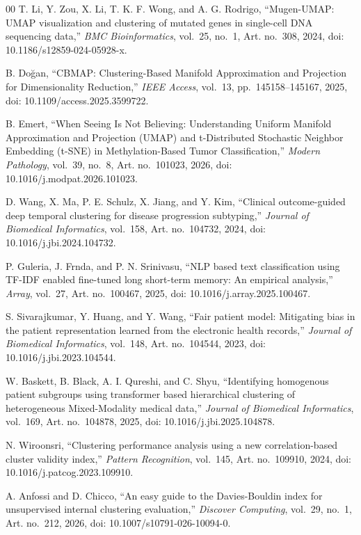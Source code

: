 \documentclass[a4paper,10pt,conference]{IEEEtran}
\begin{document}
\begin{thebibliography}{00}
 T. Li, Y. Zou, X. Li, T. K. F. Wong, and A. G. Rodrigo, ``Mugen-UMAP: UMAP visualization and clustering of mutated genes in single-cell DNA sequencing data,'' \textit{BMC Bioinformatics}, vol.~25, no.~1, Art. no.~308, 2024, doi: 10.1186/s12859-024-05928-x.

 B. Doğan, ``CBMAP: Clustering-Based Manifold Approximation and Projection for Dimensionality Reduction,'' \textit{IEEE Access}, vol.~13, pp.~145158--145167, 2025, doi: 10.1109/access.2025.3599722.

 B. Emert, ``When Seeing Is Not Believing: Understanding Uniform Manifold Approximation and Projection (UMAP) and t-Distributed Stochastic Neighbor Embedding (t-SNE) in Methylation-Based Tumor Classification,'' \textit{Modern Pathology}, vol.~39, no.~8, Art. no.~101023, 2026, doi: 10.1016/j.modpat.2026.101023.

 D. Wang, X. Ma, P. E. Schulz, X. Jiang, and Y. Kim, ``Clinical outcome-guided deep temporal clustering for disease progression subtyping,'' \textit{Journal of Biomedical Informatics}, vol.~158, Art. no.~104732, 2024, doi: 10.1016/j.jbi.2024.104732.

 P. Guleria, J. Frnda, and P. N. Srinivasu, ``NLP based text classification using TF-IDF enabled fine-tuned long short-term memory: An empirical analysis,'' \textit{Array}, vol.~27, Art. no.~100467, 2025, doi: 10.1016/j.array.2025.100467.

 S. Sivarajkumar, Y. Huang, and Y. Wang, ``Fair patient model: Mitigating bias in the patient representation learned from the electronic health records,'' \textit{Journal of Biomedical Informatics}, vol.~148, Art. no.~104544, 2023, doi: 10.1016/j.jbi.2023.104544.

 W. Baskett, B. Black, A. I. Qureshi, and C. Shyu, ``Identifying homogenous patient subgroups using transformer based hierarchical clustering of heterogeneous Mixed-Modality medical data,'' \textit{Journal of Biomedical Informatics}, vol.~169, Art. no.~104878, 2025, doi: 10.1016/j.jbi.2025.104878.

 N. Wiroonsri, ``Clustering performance analysis using a new correlation-based cluster validity index,'' \textit{Pattern Recognition}, vol.~145, Art. no.~109910, 2024, doi: 10.1016/j.patcog.2023.109910.

 A. Anfossi and D. Chicco, ``An easy guide to the Davies-Bouldin index for unsupervised internal clustering evaluation,'' \textit{Discover Computing}, vol.~29, no.~1, Art. no.~212, 2026, doi: 10.1007/s10791-026-10094-0.


\end{thebibliography}
\end{document}
